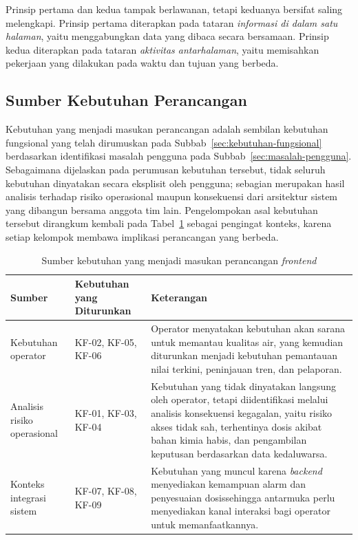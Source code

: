 Prinsip pertama dan kedua tampak berlawanan, tetapi keduanya bersifat saling melengkapi. Prinsip pertama 
diterapkan pada tataran \emph{informasi di dalam satu halaman}, yaitu menggabungkan data yang dibaca secara 
bersamaan. Prinsip kedua diterapkan pada tataran \emph{aktivitas antarhalaman}, yaitu memisahkan pekerjaan 
yang dilakukan pada waktu dan tujuan yang berbeda.

\subsection{Sumber Kebutuhan Perancangan}
Kebutuhan yang menjadi masukan perancangan adalah sembilan kebutuhan fungsional yang telah dirumuskan pada
Subbab~\ref{sec:kebutuhan-fungsional} berdasarkan identifikasi masalah pengguna pada
Subbab~\ref{sec:masalah-pengguna}. Sebagaimana dijelaskan pada perumusan kebutuhan tersebut, tidak seluruh
kebutuhan dinyatakan secara eksplisit oleh pengguna; sebagian merupakan hasil analisis terhadap risiko
operasional maupun konsekuensi dari arsitektur sistem yang dibangun bersama anggota tim lain. Pengelompokan
asal kebutuhan tersebut dirangkum kembali pada Tabel~\ref{tab:sumber-kebutuhan} sebagai pengingat konteks,
karena setiap kelompok membawa implikasi perancangan yang berbeda.

\begin{table}[H]
\centering
\caption{Sumber kebutuhan yang menjadi masukan perancangan \textit{frontend}}
\label{tab:sumber-kebutuhan}
\renewcommand{\arraystretch}{1.3}
\begin{tabular}{|p{2.5cm}|p{4cm}|p{6.5cm}|}
\hline
\textbf{Sumber} & \textbf{Kebutuhan yang Diturunkan} & \textbf{Keterangan} \\ \hline
Kebutuhan operator & KF-02, KF-05, KF-06 & Operator menyatakan kebutuhan akan sarana untuk memantau kualitas air, yang kemudian diturunkan menjadi kebutuhan pemantauan nilai terkini, peninjauan tren, dan pelaporan. \\ \hline
Analisis risiko operasional & KF-01, KF-03, KF-04 & Kebutuhan yang tidak dinyatakan langsung oleh operator, tetapi diidentifikasi melalui analisis konsekuensi kegagalan, yaitu risiko akses tidak sah, terhentinya dosis akibat bahan kimia habis, dan pengambilan keputusan berdasarkan data kedaluwarsa. \\ \hline
Konteks integrasi sistem & KF-07, KF-08, KF-09 & Kebutuhan yang muncul karena \textit{backend} menyediakan kemampuan alarm dan penyesuaian dosissehingga antarmuka perlu menyediakan kanal interaksi bagi operator untuk memanfaatkannya. \\ \hline
\end{tabular}
\end{table}

